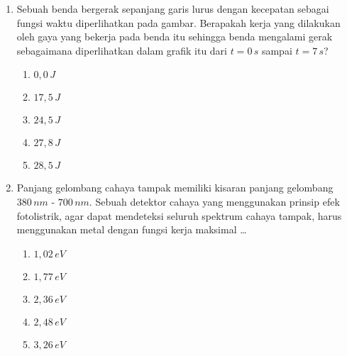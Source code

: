 \documentclass[A4,12PT, english, twocolumn]{journal}
\begin{document}
\begin{enumerate}
\newpage
\item Sebuah benda bergerak sepanjang garis lurus dengan kecepatan sebagai fungsi waktu diperlihatkan pada gambar. Berapakah kerja yang dilakukan oleh gaya yang bekerja pada benda itu sehingga benda mengalami gerak sebagaimana diperlihatkan dalam grafik itu dari $t=0 \, s$ sampai $t=7 \, s$?
\begin{center}
\end{center}
    \begin{enumerate}
        \item $0,0 \, J$
        \item $17,5 \, J$
        \item $24,5 \, J$
        \item $27,8 \, J$
        \item $28,5 \, J$
    \end{enumerate}
  
\item Panjang gelombang cahaya tampak memiliki kisaran panjang gelombang $380 \, nm$ - $700 \, nm$. Sebuah detektor cahaya yang menggunakan prinsip efek fotolistrik, agar dapat mendeteksi seluruh spektrum cahaya tampak, harus menggunakan metal dengan fungsi kerja maksimal \dots
    \begin{enumerate}
        \item $1,02 \, eV$
        \item $1,77 \, eV$
        \item $2,36 \, eV$
        \item $2,48 \, eV$
        \item $3,26 \, eV$
    \end{enumerate}
     

\end{enumerate}
\end{document}
